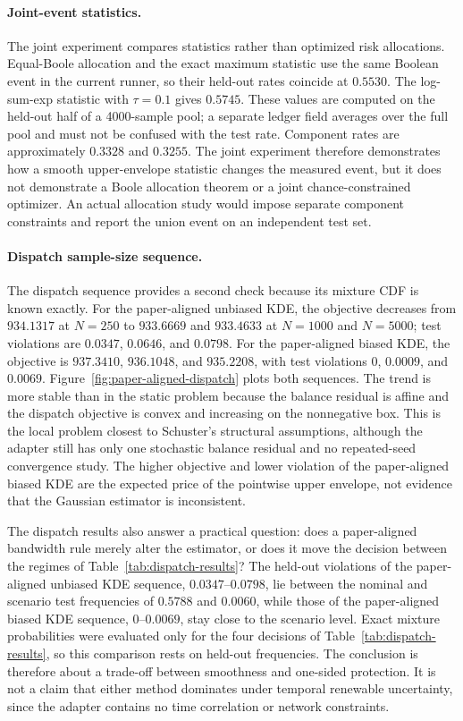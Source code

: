 \paragraph*{Joint-event statistics.}
The joint experiment compares statistics rather than optimized risk allocations. Equal-Boole allocation and the exact maximum statistic use the same Boolean event in the current runner, so their held-out rates coincide at $0.5530$. The log-sum-exp statistic with $\tau=0.1$ gives $0.5745$. These values are computed on the held-out half of a 4000-sample pool; a separate ledger field averages over the full pool and must not be confused with the test rate. Component rates are approximately $0.3328$ and $0.3255$. The joint experiment therefore demonstrates how a smooth upper-envelope statistic changes the measured event, but it does not demonstrate a Boole allocation theorem or a joint chance-constrained optimizer. An actual allocation study would impose separate component constraints and report the union event on an independent test set.

\paragraph*{Dispatch sample-size sequence.}
The dispatch sequence provides a second check because its mixture CDF is known exactly. For the paper-aligned unbiased KDE, the objective decreases from $934.1317$ at $N=250$ to $933.6669$ and $933.4633$ at $N=1000$ and $N=5000$; test violations are $0.0347$, $0.0646$, and $0.0798$. For the paper-aligned biased KDE, the objective is $937.3410$, $936.1048$, and $935.2208$, with test violations $0$, $0.0009$, and $0.0069$. Figure~\ref{fig:paper-aligned-dispatch} plots both sequences. The trend is more stable than in the static problem because the balance residual is affine and the dispatch objective is convex and increasing on the nonnegative box. This is the local problem closest to Schuster's structural assumptions, although the adapter still has only one stochastic balance residual and no repeated-seed convergence study. The higher objective and lower violation of the paper-aligned biased KDE are the expected price of the pointwise upper envelope, not evidence that the Gaussian estimator is inconsistent.

The dispatch results also answer a practical question: does a paper-aligned bandwidth rule merely alter the estimator, or does it move the decision between the regimes of Table~\ref{tab:dispatch-results}? The held-out violations of the paper-aligned unbiased KDE sequence, $0.0347$--$0.0798$, lie between the nominal and scenario test frequencies of $0.5788$ and $0.0060$, while those of the paper-aligned biased KDE sequence, $0$--$0.0069$, stay close to the scenario level. Exact mixture probabilities were evaluated only for the four decisions of Table~\ref{tab:dispatch-results}, so this comparison rests on held-out frequencies. The conclusion is therefore about a trade-off between smoothness and one-sided protection. It is not a claim that either method dominates under temporal renewable uncertainty, since the adapter contains no time correlation or network constraints.

